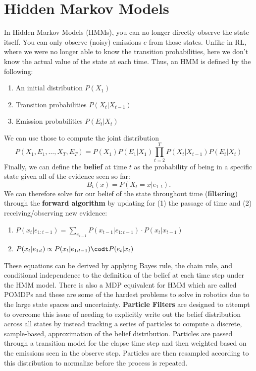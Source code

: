 \documentclass[a4paper]{article}
\begin{document}
\section*{Hidden Markov Models}

In Hidden Markov Models (HMMs), you can no longer directly observe the state itself. You can only observe (noisy) emissions $e$ from those states. Unlike in RL, where we were no longer able to know the transition probabilities, here we don't know the actual value of the state at each time. Thus, an HMM is defined by the following:
\begin{enumerate}
\item An initial distribution $P(X_1)$
\item Transition probabilities $P(X_{t}|X_{t-1})$
\item Emission probabilities $P(E_t|X_t)$
\end{enumerate}
We can use those to compute the joint distribution
\[
P(X_1, E_1, \ldots, X_T, E_T) = P(X_1) P(E_1|X_1) \prod_{t=2}^T P(X_{t}|X_{t-1}) P(E_t|X_t)
\]
Finally, we can define the \textbf{belief} at time $t$ as the probability of being in a specific state given all of the evidence seen so far:
\[
B_t(x) = P(X_t=x|e_{1:t}).
\]
We can therefore solve for our belief of the state throughout time (\textbf{filtering}) through the \textbf{forward algorithm} by updating for (1) the passage of time and (2) receiving/observing new evidence:
\begin{enumerate}
\item $P(x_t|e_{1:t-1}) = \sum_{x_{t-1}} P(x_{t-1}|e_{1:t-1}) \cdot P(x_t|x_{t-1})$
\item $P(x_t|e_{1:t}) \propto P(x_t|e_{1:t-1}) \codt P(e_t|x_t)$
\end{enumerate}
These equations can be derived by applying Bayes rule, the chain rule, and conditional independence to the definition of the belief at each time step under the HMM model. There is also a MDP equivalent for HMM which are called POMDPs and these are some of the hardest problems to solve in robotics due to the large state spaces and uncertainty. \textbf{Particle Filters} are designed to attempt to overcome this issue of needing to explicitly write out the belief distribution across all states by instead tracking a series of particles to compute a discrete, sample-based, approximation of the belief distribution. Particles are passed through a transition model for the elapse time step and then weighted based on the emissions seen in the observe step. Particles are then resampled according to this distribution to normalize before the process is repeated.
\end{document}
